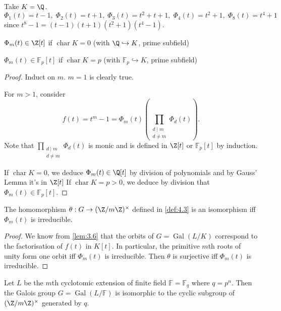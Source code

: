 \documentclass{article}
\DeclareMathOperator{\chara}{char}
\DeclareMathOperator{\Gal}{Gal}
\newcommand{\F}{\mathbb{F}}
\begin{document}
\begin{eg}
    Take $K = \Q$.
    \begin{equation*}
        \Phi_1(t) = t-1, \; \Phi_2(t) = t+1, \; \Phi_3(t) = t^2 + t + 1, \; \Phi_4(t) = t^2 + 1, \; \Phi_8(t) = t^4 + 1
    \end{equation*}
    since $t^8-1 = (t-1)(t+1)(t^2 + 1)(t^4 - 1)$.
\end{eg}

\begin{nlemma}\label{lem:4.5}
    $\Phi_m(t) \in \Z[t]$ if $\chara K = 0$ (with $\Q \hookrightarrow K$, prime subfield)

    $\Phi_m(t) \in \F_p[t]$ if $\chara K = p$ (with $\F_p \hookrightarrow K$, prime subfield)
\end{nlemma}

\begin{proof}
    Induct on $m$. $m=1$ is clearly true.

    For $m>1$, consider
    \begin{equation*}
        f(t) = t^m - 1 = \Phi_m(t) (\prod_{\substack{d \mid m \\ d \neq m}} \Phi_d(t)).
    \end{equation*}
    Note that $\prod_{\substack{d \mid m \\ d \neq m}} \Phi_d(t)$ is monic and is defined in $\Z[t]$ or $\F_p[t]$ by induction.

    If $\chara K = 0$, we deduce $\Phi_m(t) \in \Q[t]$ by division of polynomials and by Gauss' Lemma it's in $\Z[t]$
    If $\chara K = p > 0$, we deduce by division that $\Phi_m(t) \in \F_p[t]$.
\end{proof}

\begin{nlemma}\label{lem:4.6}
    The homomorphism $\theta: G \to (\Z/m\Z)^\times$ defined in \cref{def:4.3} is an isomorphism iff $\Phi_m(t)$ is irreducible.
\end{nlemma}

\begin{proof}
    We know from \cref{lem:3.6} that the orbits of $G = \Gal(L/K)$ correspond to the factorisation of $f(t)$ in $K[t]$.
    In particular, the primitive $m$th roots of unity form one orbit iff $\Phi_m(t)$ is irreducible.
    Then $\theta$ is surjective iff $\Phi_m(t)$ is irreducible.
\end{proof}

\begin{nthm}\label{thm:4.7}
    Let $L$ be the $m$th cyclotomic extension of finite field $\F = \F_q$ where $q = p^n$.
    Then the Galois group $G = \Gal(L/\F)$ is isomorphic to the cyclic subgroup of $(\Z/m\Z)^\times$ generated by $q$.
\end{nthm}
\end{document}

